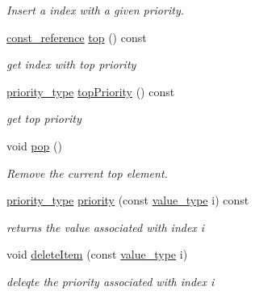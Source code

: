 \begin{DoxyCompactItemize}
\begin{DoxyCompactList}\small\item\em Insert a index with a given priority. \end{DoxyCompactList}\item 
\hyperlink{classnifty_1_1tools_1_1ChangeablePriorityQueue_acb7eb23bd9ca7c52955adc06bf4816c3}{const\+\_\+reference} \hyperlink{classnifty_1_1tools_1_1ChangeablePriorityQueue_acbfa1600a36b452c65f774f3af32cd02}{top} () const 
\begin{DoxyCompactList}\small\item\em get index with top priority \end{DoxyCompactList}\item 
\hyperlink{classnifty_1_1tools_1_1ChangeablePriorityQueue_a6ecafb387f99a1cfa7ff5795c924682c}{priority\+\_\+type} \hyperlink{classnifty_1_1tools_1_1ChangeablePriorityQueue_aa0f5e1ac67eb42e45ee6470483646b31}{top\+Priority} () const 
\begin{DoxyCompactList}\small\item\em get top priority \end{DoxyCompactList}\item 
void \hyperlink{classnifty_1_1tools_1_1ChangeablePriorityQueue_a7c5e4f9f3f2a837a9a1738144c76c17d}{pop} ()
\begin{DoxyCompactList}\small\item\em Remove the current top element. \end{DoxyCompactList}\item 
\hyperlink{classnifty_1_1tools_1_1ChangeablePriorityQueue_a6ecafb387f99a1cfa7ff5795c924682c}{priority\+\_\+type} \hyperlink{classnifty_1_1tools_1_1ChangeablePriorityQueue_a6eceb658416fdce27ec6056984bbb432}{priority} (const \hyperlink{classnifty_1_1tools_1_1ChangeablePriorityQueue_aa00fbc748b94bdc6175b4c49bb2bba48}{value\+\_\+type} i) const 
\begin{DoxyCompactList}\small\item\em returns the value associated with index i \end{DoxyCompactList}\item 
void \hyperlink{classnifty_1_1tools_1_1ChangeablePriorityQueue_af5b15b7c4cfedc7f95d168553a06a189}{delete\+Item} (const \hyperlink{classnifty_1_1tools_1_1ChangeablePriorityQueue_aa00fbc748b94bdc6175b4c49bb2bba48}{value\+\_\+type} i)
\begin{DoxyCompactList}\small\item\em deleqte the priority associated with index i \end{DoxyCompactList}\item 

\end{DoxyCompactItemize}
